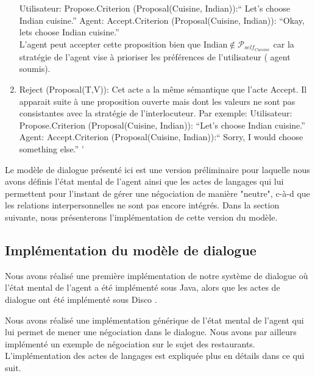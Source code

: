 \documentclass[a4paper,french]{article}
\begin{document}
\begin{enumerate}
		\subitem Utilisateur: Propose.Criterion (Proposal(Cuisine, Indian)):`` Let's choose Indian cuisine.''
		\subitem Agent: Accept.Criterion (Proposal(Cuisine, Indian)): ``Okay, lets choose Indian cuisine.''
		\\L'agent peut accepter cette proposition bien que Indian$\notin \mathcal{P}_{self_{Cuisine}}$ car la stratégie de l'agent vise à prioriser  les préférences de l'utilisateur ( agent soumis).
		\\	
		\item Reject (Proposal(T,V)): Cet acte a la même sémantique que l'acte Accept. Il apparait suite à une proposition ouverte mais dont les valeurs ne sont pas consistantes avec la stratégie de l'interlocuteur. Par exemple: 
		\subitem Utilisateur: Propose.Criterion (Proposal(Cuisine, Indian)): ``Let's choose Indian cuisine.'' 
		\subitem Agent: Accept.Criterion (Proposal(Cuisine, Indian)):`` Sorry, I would choose something else.'' ' 
	
\end{enumerate}

\par Le modèle de dialogue présenté ici est une version préliminaire pour laquelle nous avons définis l'état mental de l'agent ainsi que les actes de langages qui lui permettent pour l'instant de gérer une négociation de manière "neutre", c-à-d que les relations interpersonnelles ne sont pas encore intégrés. Dans la section suivante, nous présenterons l'implémentation de cette version du modèle. 

\subsection{Implémentation du modèle de dialogue}
\par Nous avons réalisé une première implémentation de notre système de dialogue où l'état mental de l'agent a été implémenté sous Java, alors que les actes de dialogue ont été implémenté sous Disco \cite{rich2009building}.
\par Nous avons réalisé une implémentation générique de l'état mental de l'agent qui lui permet de mener une négociation dans le dialogue. Nous avons par ailleurs implémenté un exemple de négociation sur le sujet des restaurants.  L'implémentation des actes de langages est expliquée plus en détails dans ce qui suit.
\end{document}
